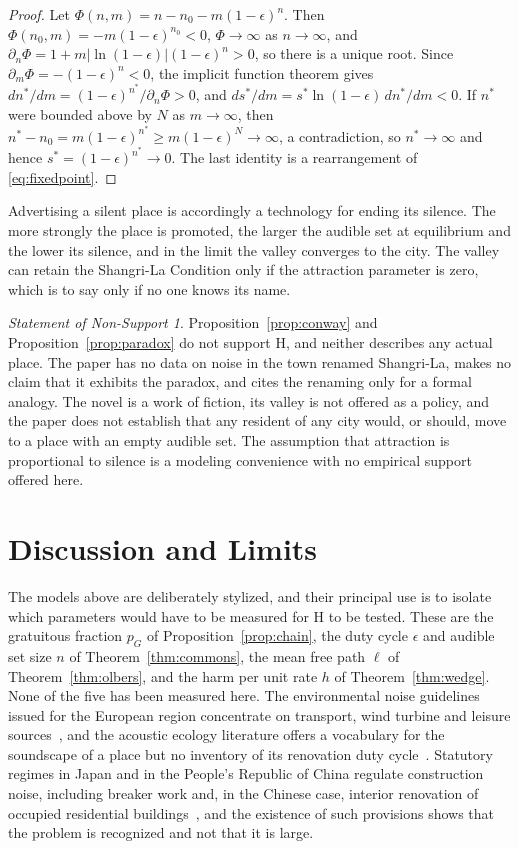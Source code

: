 \documentclass[11pt]{article}
\theoremstyle{definition}
\theoremstyle{remark}
\newtheorem{nonsupport}{Statement of Non-Support}
\begin{document}
\begin{proof}
Let $\Phi(n,m)=n-n_0-m(1-\epsilon)^n$. Then $\Phi(n_0,m)=-m(1-\epsilon)^{n_0}<0$, $\Phi\to\infty$ as $n\to\infty$, and $\partial_n\Phi = 1+m|\ln(1-\epsilon)|(1-\epsilon)^n>0$, so there is a unique root. Since $\partial_m\Phi=-(1-\epsilon)^n<0$, the implicit function theorem gives $dn^*/dm=(1-\epsilon)^{n^*}/\partial_n\Phi>0$, and $ds^*/dm=s^*\ln(1-\epsilon)\,dn^*/dm<0$. If $n^*$ were bounded above by $N$ as $m\to\infty$, then $n^*-n_0=m(1-\epsilon)^{n^*}\ge m(1-\epsilon)^N\to\infty$, a contradiction, so $n^*\to\infty$ and hence $s^*=(1-\epsilon)^{n^*}\to0$. The last identity is a rearrangement of \eqref{eq:fixedpoint}.
\end{proof}

Advertising a silent place is accordingly a technology for ending its silence. The more strongly the place is promoted, the larger the audible set at equilibrium and the lower its silence, and in the limit the valley converges to the city. The valley can retain the Shangri-La Condition only if the attraction parameter is zero, which is to say only if no one knows its name.

\begin{nonsupport}\label{ns:shangri}
Proposition~\ref{prop:conway} and Proposition~\ref{prop:paradox} do not support H, and neither describes any actual place. The paper has no data on noise in the town renamed Shangri-La, makes no claim that it exhibits the paradox, and cites the renaming only for a formal analogy. The novel is a work of fiction, its valley is not offered as a policy, and the paper does not establish that any resident of any city would, or should, move to a place with an empty audible set. The assumption that attraction is proportional to silence is a modeling convenience with no empirical support offered here.
\end{nonsupport}

\section{Discussion and Limits}\label{sec:discussion}

The models above are deliberately stylized, and their principal use is to isolate which parameters would have to be measured for H to be tested. These are the gratuitous fraction $p_G$ of Proposition~\ref{prop:chain}, the duty cycle $\epsilon$ and audible set size $n$ of Theorem~\ref{thm:commons}, the mean free path $\ell$ of Theorem~\ref{thm:olbers}, and the harm per unit rate $h$ of Theorem~\ref{thm:wedge}. None of the five has been measured here. The environmental noise guidelines issued for the European region concentrate on transport, wind turbine and leisure sources~\cite{who}, and the acoustic ecology literature offers a vocabulary for the soundscape of a place but no inventory of its renovation duty cycle~\cite{schafer}. Statutory regimes in Japan and in the People's Republic of China regulate construction noise, including breaker work and, in the Chinese case, interior renovation of occupied residential buildings~\cite{japanlaw,chinalaw}, and the existence of such provisions shows that the problem is recognized and not that it is large.
\end{document}
